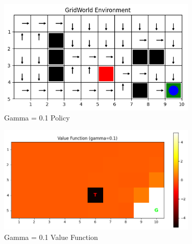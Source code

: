 \documentclass[12pt]{article}
\begin{document}
\begin{figure}[H]
  \centering
  \includegraphics[width=0.85\textwidth]{images/part2_q2_gamma_0.1_policy.png}
  \caption{Gamma = 0.1 Policy}
\end{figure}
\begin{figure}[H]
  \centering
  \includegraphics[width=0.85\textwidth]{images/part2_q2_gamma_0.1_value.png}
  \caption{Gamma = 0.1 Value Function}
\end{figure}
\end{document}
